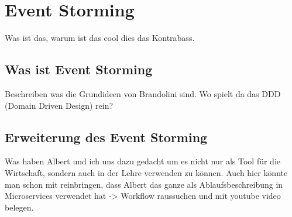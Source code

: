 \chapter{Event Storming}\label{ch:Event Storming}
Was ist das, warum ist das cool dies das Kontrabass.

\section{Was ist Event Storming}
Beschreiben was die Grundideen von Brandolini sind.
Wo spielt da das DDD (Domain Driven Design) rein?

\section{Erweiterung des Event Storming}
Was haben Albert und ich uns dazu gedacht um es nicht nur als Tool für die Wirtschaft, sondern
auch in der Lehre verwenden zu können.
Auch hier könnte man schon mit reinbringen, dass Albert das ganze als Ablaufsbeschreibung in
Microservices verwendet hat -> Workflow raussuchen und mit youtube video belegen.